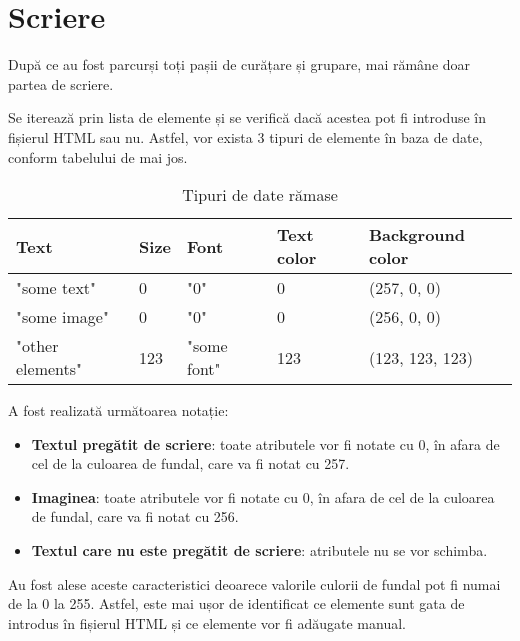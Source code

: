 \section{Scriere}

După ce au fost parcurși toți pașii de curățare și grupare, mai rămâne doar partea de scriere. 

Se iterează prin lista de elemente și se verifică dacă acestea pot fi introduse în  fișierul HTML sau nu. Astfel, vor exista 3 tipuri de elemente în baza de date, conform tabelului de mai jos.
\begin{table}[H]
	\centering
	\begin{tabular}{|l|l|l|l|l|}
		\hline
		Text             & Size & Font        & Text color & Background color \\ \hline
		"some text"      & 0    & "0"         & 0          & (257, 0, 0)      \\ \hline
		"some image"     & 0    & "0"         & 0          & (256, 0, 0)      \\ \hline
		"other elements" & 123  & "some font" & 123        & (123, 123, 123)  \\ \hline
	\end{tabular}
	\caption{Tipuri de date rămase}
\end{table}

A fost realizată următoarea notație:

\begin{itemize}
	\item \textbf{Textul pregătit de scriere}: toate atributele vor fi notate cu 0, în afara de cel de la culoarea de fundal, care va fi notat cu 257. 
	\item \textbf{Imaginea}: toate atributele vor fi notate cu 0, în afara de cel de la culoarea de fundal, care va fi notat cu 256. 
	\item \textbf{Textul care nu este pregătit de scriere}: atributele nu se vor schimba. 
\end{itemize}

Au fost alese aceste caracteristici deoarece valorile culorii de fundal pot fi numai de la 0 la 255. Astfel, este mai ușor de identificat ce elemente sunt gata de introdus în fișierul HTML și ce elemente vor fi adăugate manual.